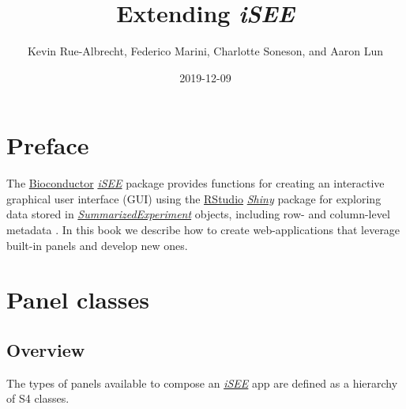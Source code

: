 \documentclass[]{book}
\title{Extending \emph{iSEE}}
\author{Kevin Rue-Albrecht, Federico Marini, Charlotte Soneson, and Aaron Lun}
\date{2019-12-09}
\begin{document}
\maketitle

{
\setcounter{tocdepth}{1}
\tableofcontents
}
\hypertarget{preface}{%
\chapter*{Preface}\label{preface}}

The \href{https://bioconductor.org/}{Bioconductor} \emph{\href{https://bioconductor.org/packages/3.11/iSEE}{iSEE}} package provides functions for creating an interactive graphical user interface (GUI) using the \href{https://rstudio.com/}{RStudio} \emph{\href{https://CRAN.R-project.org/package=Shiny}{Shiny}} package for exploring data stored in \emph{\href{https://bioconductor.org/packages/3.11/SummarizedExperiment}{SummarizedExperiment}} objects, including row- and column-level metadata \citep{rue2018isee}.
In this book we describe how to create web-applications that leverage built-in panels and develop new ones.

\hypertarget{panel-classes}{%
\chapter{Panel classes}\label{panel-classes}}

\hypertarget{overview}{%
\section{Overview}\label{overview}}

The types of panels available to compose an \emph{\href{https://bioconductor.org/packages/3.11/iSEE}{iSEE}} app are defined as a hierarchy of S4 classes.
\end{document}
